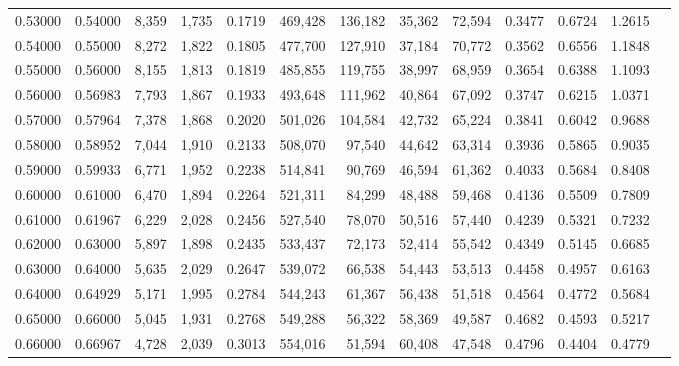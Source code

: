 \begin{tabular}{rrrrrrrrrrrrr}
0.53000 & 0.54000 &  8,359 & 1,735 &                                     0.1719 & 469,428 & 136,182 &  35,362 &  72,594 & 0.3477 & 0.6724 & 1.2615 \\
0.54000 & 0.55000 &  8,272 & 1,822 &                                     0.1805 & 477,700 & 127,910 &  37,184 &  70,772 & 0.3562 & 0.6556 & 1.1848 \\
0.55000 & 0.56000 &  8,155 & 1,813 &                                     0.1819 & 485,855 & 119,755 &  38,997 &  68,959 & 0.3654 & 0.6388 & 1.1093 \\
0.56000 & 0.56983 &  7,793 & 1,867 &                                     0.1933 & 493,648 & 111,962 &  40,864 &  67,092 & 0.3747 & 0.6215 & 1.0371 \\
0.57000 & 0.57964 &  7,378 & 1,868 &                                     0.2020 & 501,026 & 104,584 &  42,732 &  65,224 & 0.3841 & 0.6042 & 0.9688 \\
0.58000 & 0.58952 &  7,044 & 1,910 &                                     0.2133 & 508,070 &  97,540 &  44,642 &  63,314 & 0.3936 & 0.5865 & 0.9035 \\
0.59000 & 0.59933 &  6,771 & 1,952 &                                     0.2238 & 514,841 &  90,769 &  46,594 &  61,362 & 0.4033 & 0.5684 & 0.8408 \\
0.60000 & 0.61000 &  6,470 & 1,894 &                                     0.2264 & 521,311 &  84,299 &  48,488 &  59,468 & 0.4136 & 0.5509 & 0.7809 \\
0.61000 & 0.61967 &  6,229 & 2,028 &                                     0.2456 & 527,540 &  78,070 &  50,516 &  57,440 & 0.4239 & 0.5321 & 0.7232 \\
0.62000 & 0.63000 &  5,897 & 1,898 &                                     0.2435 & 533,437 &  72,173 &  52,414 &  55,542 & 0.4349 & 0.5145 & 0.6685 \\
0.63000 & 0.64000 &  5,635 & 2,029 &                                     0.2647 & 539,072 &  66,538 &  54,443 &  53,513 & 0.4458 & 0.4957 & 0.6163 \\
0.64000 & 0.64929 &  5,171 & 1,995 &                                     0.2784 & 544,243 &  61,367 &  56,438 &  51,518 & 0.4564 & 0.4772 & 0.5684 \\
0.65000 & 0.66000 &  5,045 & 1,931 &                                     0.2768 & 549,288 &  56,322 &  58,369 &  49,587 & 0.4682 & 0.4593 & 0.5217 \\
0.66000 & 0.66967 &  4,728 & 2,039 &                                     0.3013 & 554,016 &  51,594 &  60,408 &  47,548 & 0.4796 & 0.4404 & 0.4779 \\

\end{tabular}
